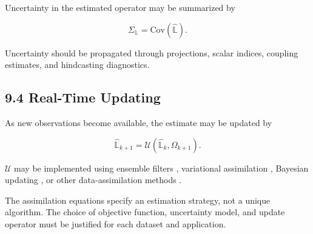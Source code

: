Uncertainty in the estimated operator may be summarized by

\[ \Sigma_{\mathbb{L}}=\mathrm{Cov}(\hat{\mathbb{L}}). \]

Uncertainty should be propagated through projections, scalar indices, coupling estimates, and hindcasting diagnostics.

\subsection{9.4 Real-Time Updating}

As new observations become available, the estimate may be updated by

\[ \hat{\mathbb{L}}_{k+1}=\mathcal{U}(\hat{\mathbb{L}}_k,\Omega_{k+1}). \]

\(\mathcal{U}\) may be implemented using ensemble filters \cite{Kalnay2003Assimilation}, variational assimilation \cite{Kalnay2003Assimilation}, Bayesian updating \cite{Jaynes1957I}, or other data-assimilation methods \cite{Kalnay2003Assimilation}.

The assimilation equations specify an estimation strategy, not a unique algorithm. The choice of objective function, uncertainty model, and update operator must be justified for each dataset and application.


